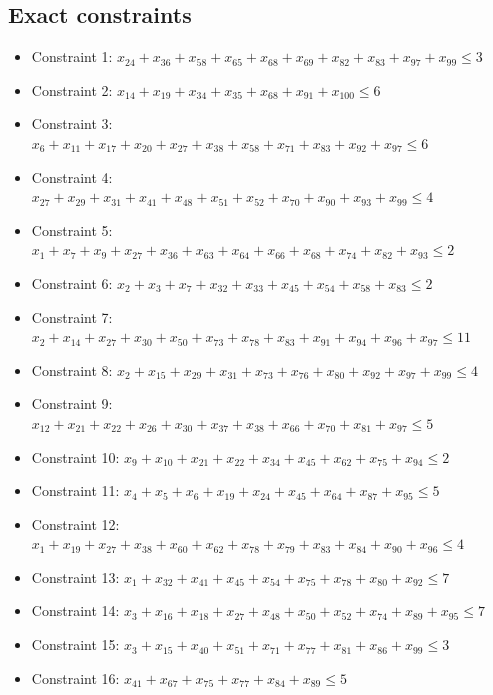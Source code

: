 \documentclass[11pt]{article}
\begin{document}
\subsection*{Exact constraints}
\begin{itemize}
\item Constraint 1: $x_{24} + x_{36} + x_{58} + x_{65} + x_{68} + x_{69} + x_{82} + x_{83} + x_{97} + x_{99} \le 3$
\item Constraint 2: $x_{14} + x_{19} + x_{34} + x_{35} + x_{68} + x_{91} + x_{100} \le 6$
\item Constraint 3: $x_{6} + x_{11} + x_{17} + x_{20} + x_{27} + x_{38} + x_{58} + x_{71} + x_{83} + x_{92} + x_{97} \le 6$
\item Constraint 4: $x_{27} + x_{29} + x_{31} + x_{41} + x_{48} + x_{51} + x_{52} + x_{70} + x_{90} + x_{93} + x_{99} \le 4$
\item Constraint 5: $x_{1} + x_{7} + x_{9} + x_{27} + x_{36} + x_{63} + x_{64} + x_{66} + x_{68} + x_{74} + x_{82} + x_{93} \le 2$
\item Constraint 6: $x_{2} + x_{3} + x_{7} + x_{32} + x_{33} + x_{45} + x_{54} + x_{58} + x_{83} \le 2$
\item Constraint 7: $x_{2} + x_{14} + x_{27} + x_{30} + x_{50} + x_{73} + x_{78} + x_{83} + x_{91} + x_{94} + x_{96} + x_{97} \le 11$
\item Constraint 8: $x_{2} + x_{15} + x_{29} + x_{31} + x_{73} + x_{76} + x_{80} + x_{92} + x_{97} + x_{99} \le 4$
\item Constraint 9: $x_{12} + x_{21} + x_{22} + x_{26} + x_{30} + x_{37} + x_{38} + x_{66} + x_{70} + x_{81} + x_{97} \le 5$
\item Constraint 10: $x_{9} + x_{10} + x_{21} + x_{22} + x_{34} + x_{45} + x_{62} + x_{75} + x_{94} \le 2$
\item Constraint 11: $x_{4} + x_{5} + x_{6} + x_{19} + x_{24} + x_{45} + x_{64} + x_{87} + x_{95} \le 5$
\item Constraint 12: $x_{1} + x_{19} + x_{27} + x_{38} + x_{60} + x_{62} + x_{78} + x_{79} + x_{83} + x_{84} + x_{90} + x_{96} \le 4$
\item Constraint 13: $x_{1} + x_{32} + x_{41} + x_{45} + x_{54} + x_{75} + x_{78} + x_{80} + x_{92} \le 7$
\item Constraint 14: $x_{3} + x_{16} + x_{18} + x_{27} + x_{48} + x_{50} + x_{52} + x_{74} + x_{89} + x_{95} \le 7$
\item Constraint 15: $x_{3} + x_{15} + x_{40} + x_{51} + x_{71} + x_{77} + x_{81} + x_{86} + x_{99} \le 3$
\item Constraint 16: $x_{41} + x_{67} + x_{75} + x_{77} + x_{84} + x_{89} \le 5$

\end{itemize}
\end{document}
